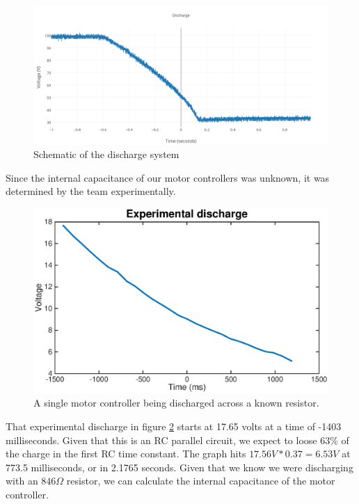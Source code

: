 \documentclass{article}
\begin{document}

            \begin{figure}[H]
                \centering
                \includegraphics[width = 0.8 \textwidth]{Discharge}
                \caption{Schematic of the discharge system}
                \label{dischargeschem}
            \end{figure}

            Since the internal capacitance of our motor controllers was unknown, it was determined by the team experimentally.

            \begin{figure}[H]
                \centering
                \includegraphics[width = 0.8  \textwidth]{experimental_discharge.eps}
                \caption{A single motor controller being discharged across a known resistor.}
                \label{discharge}
            \end{figure}

            That experimental discharge in figure \ref{discharge} starts at 17.65 volts at a time of -1403 milliseconds. Given that this is an RC parallel circuit, we expect to loose 63\% of the charge in the first RC time constant. The graph hits $17.56 V * 0.37 = 6.53 V$ at 773.5 milliseconds, or in 2.1765 seconds. Given that we know we were discharging with an $846 \Omega$ resistor, we can calculate the internal capacitance of the motor controller.
\end{document}
